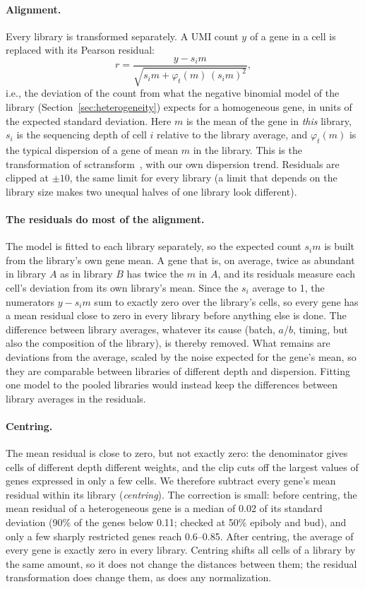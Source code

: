 \documentclass[11pt,a4paper]{article}
\begin{document}
\paragraph{Alignment.} Every library is transformed separately. A UMI count $y$ of a gene in a cell is replaced with its Pearson residual:
\[
	r = \frac{y - s_i m}{\sqrt{s_i m + \varphi_t(m)\,(s_i m)^2}},
\]
i.e., the deviation of the count from what the negative binomial model of the library (Section~\ref{sec:heterogeneity}) expects for a homogeneous gene, in units of the expected standard deviation. Here $m$ is the mean of the gene in \emph{this} library, $s_i$ is the sequencing depth of cell $i$ relative to the library average, and $\varphi_t(m)$ is the typical dispersion of a gene of mean $m$ in the library. This is the transformation of sctransform~\cite{hafemeister2019sctransform}, with our own dispersion trend. Residuals are clipped at $\pm 10$, the same limit for every library (a limit that depends on the library size makes two unequal halves of one library look different).

\paragraph{The residuals do most of the alignment.} The model is fitted to each library separately, so the expected count $s_i m$ is built from the library's own gene mean. A gene that is, on average, twice as abundant in library $A$ as in library $B$ has twice the $m$ in $A$, and its residuals measure each cell's deviation from its own library's mean. Since the $s_i$ average to 1, the numerators $y - s_i m$ sum to exactly zero over the library's cells, so every gene has a mean residual close to zero in every library before anything else is done. The difference between library averages, whatever its cause (batch, $a$/$b$, timing, but also the composition of the library), is thereby removed. What remains are deviations from the average, scaled by the noise expected for the gene's mean, so they are comparable between libraries of different depth and dispersion. Fitting one model to the pooled libraries would instead keep the differences between library averages in the residuals.

\paragraph{Centring.} The mean residual is close to zero, but not exactly zero: the denominator gives cells of different depth different weights, and the clip cuts off the largest values of genes expressed in only a few cells. We therefore subtract every gene's mean residual within its library (\emph{centring}). The correction is small: before centring, the mean residual of a heterogeneous gene is a median of 0.02 of its standard deviation (90\% of the genes below 0.11; checked at 50\% epiboly and bud), and only a few sharply restricted genes reach 0.6--0.85. After centring, the average of every gene is exactly zero in every library. Centring shifts all cells of a library by the same amount, so it does not change the distances between them; the residual transformation does change them, as does any normalization.
\end{document}

